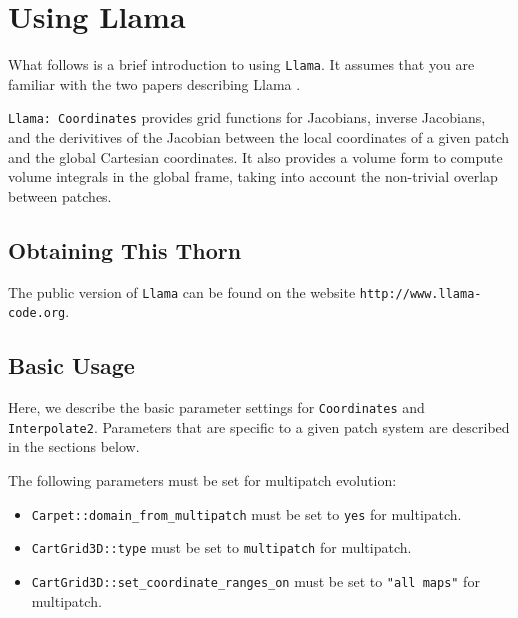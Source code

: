 \documentclass{article}
\begin{document}
\section{Using Llama}
\label{sec:use}

What follows is a brief introduction to using {\tt Llama}. It assumes that
you are familiar with the two papers describing Llama \cite{Llama_Pollney:2009yz,Llama_Reisswig:2012nc}.

{\tt Llama: Coordinates} provides grid functions for Jacobians, inverse Jacobians, and the derivitives
of the Jacobian between the local coordinates of a given patch and the global Cartesian coordinates.
It also provides a volume form to compute volume integrals in the global frame, taking into account the non-trivial
overlap between patches.


\subsection{Obtaining This Thorn}

The public version of {\tt Llama} can be found on the
website {\tt http://www.llama-code.org}. 

\subsection{Basic Usage}


Here, we describe the basic parameter settings for {\tt Coordinates} and {\tt Interpolate2}.
Parameters that are specific to a given patch system are described in the sections below.

The following parameters must be set for multipatch evolution:
\begin{itemize}
 \item {\verb|Carpet::domain_from_multipatch|} must be set to {\tt yes} for multipatch.
  \item {\verb|CartGrid3D::type|} must be set to {\tt multipatch} for multipatch.
  \item {\verb|CartGrid3D::set_coordinate_ranges_on|} must be set to {\tt "all maps"} for multipatch.
\end{itemize}
\end{document}

